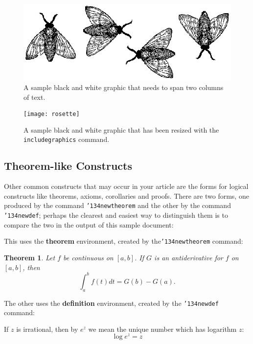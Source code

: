 \documentclass{sig-alternate-05-2015}
\begin{document}
\begin{figure}
\centering
\includegraphics{flies}
\caption{A sample black and white graphic
that needs to span two columns of text.}
\end{figure}


\begin{figure}
\centering
\texttt{[image: rosette]}
\caption{A sample black and white graphic that has
been resized with the \texttt{includegraphics} command.}
\vskip -6pt
\end{figure}

\subsection{Theorem-like Constructs}
Other common constructs that may occur in your article are
the forms for logical constructs like theorems, axioms,
corollaries and proofs.  There are
two forms, one produced by the
command \texttt{{\char'134}newtheorem} and the
other by the command \texttt{{\char'134}newdef}; perhaps
the clearest and easiest way to distinguish them is
to compare the two in the output of this sample document:

This uses the \textbf{theorem} environment, created by
the\linebreak\texttt{{\char'134}newtheorem} command:
\newtheorem{theorem}{Theorem}
\begin{theorem}
Let $f$ be continuous on $[a,b]$.  If $G$ is
an antiderivative for $f$ on $[a,b]$, then
\begin{displaymath}\int^b_af(t)dt = G(b) - G(a).\end{displaymath}
\end{theorem}

The other uses the \textbf{definition} environment, created
by the \texttt{{\char'134}newdef} command:
\begin{definition}
If $z$ is irrational, then by $e^z$ we mean the
unique number which has
logarithm $z$: \begin{displaymath}{\log e^z = z}\end{displaymath}
\end{definition}
\end{document}
